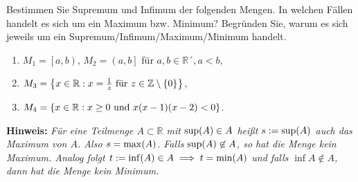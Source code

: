 \documentclass[german,12pt]{homework}
\newcommand{\ZZ}{\mathbb{Z}}
\newcommand{\RR}{\mathbb{R}}
\DeclarePairedDelimiter{\enbrace}{(}{)}
\DeclarePairedDelimiter{\penbrace}{\{}{\}}
\begin{document}
    \begin{problem}
        Bestimmen Sie Supremum und Infimum der folgenden Mengen. In welchen
        Fällen handelt es sich um ein Maximum bzw. Minimum? Begründen Sie,
        warum es sich jeweils um ein Supremum/Infimum/Maximum/Minimum handelt.
        \begin{enumerate}
            \item \(M_1 = \left[a, b\right)\), \(M_2 = \left(a, b\right]\) für
            \(a, b \in \RR´, a < b\),
            \item \(M_3 = \penbrace*{x \in \RR : x = \frac{1}{z}\text{ für }z
            \in \ZZ \setminus \penbrace*{0}}\),
            \item \(M_4 = \penbrace*{x \in \RR : x \ge 0\text{ und
            }x\enbrace*{x - 1}\enbrace*{x - 2} < 0}\).
        \end{enumerate}

        \textbf{Hinweis:} \quad \emph{Für eine Teilmenge \(A \subset \RR\) mit
        \(\sup\enbrace*{A} \in A\) heißt \(s := \sup\enbrace*{A}\) auch das
        Maximum von \(A\). Also \(s = \max\enbrace*{A}\). Falls
        \(\sup\enbrace*{A} \not\in A\), so hat die Menge kein Maximum. Analog
        folgt \(t := \inf\enbrace*{A} \in A \implies t = \min\enbrace*{A}\) und
        falls \(\inf{A} \not\in A\), dann hat die Menge kein Minimum.}
    \end{problem}
\end{document}
